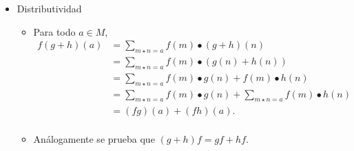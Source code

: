 \begin{itemize}
\begin{itemize}
	
		
		\item Asociatividad: para todo \( a \in M \),
		\begin{align*}
			((fg)h)(a) 
			&= \sum_{x \star y = a} (fg)(x) \bullet h(y) \\[5pt]
			&= \sum_{x \star y = a} \left( \sum_{m \star n = x} f(m) \bullet g(n) \right) \bullet h(y) \\[5pt]
			&= \sum_{\substack{m, n, y \in M \\ (m \star n) \star y = a}} \left(f(m) \bullet g(n)\right) \bullet h(y) \\[5pt]
			&= \sum_{\substack{m, n, y \in M \\ m \star (n \star y) = a}} f(m) \bullet\left( g(n) \bullet h(y)\right) \\[5pt]
			&= \sum_{m \star p = a} f(m) \bullet \left( \sum_{n \star y = p} g(n) \bullet h(y) \right) \\[5pt]
			&= \sum_{m \star p = a} f(m) \bullet (gh)(p) \\[5pt]
			&= (f(gh))(a). \\[5pt]
		\end{align*}
	\end{itemize}
	
	\item Distributividad
	\begin{itemize}
		\item Para todo \( a \in M \),
		\begin{align*}
			f(g + h)(a) 
			&= \sum_{m \star n = a} f(m) \bullet (g + h)(n) \\[5pt]
			&= \sum_{m \star n = a} f(m) \bullet (g(n) + h(n)) \\[5pt]
			&= \sum_{m \star n = a} f(m) \bullet g(n) + f(m) \bullet h(n) \\[5pt]
			&= \sum_{m \star n = a} f(m) \bullet g(n) + \sum_{m \star n = a} f(m) \bullet h(n) \\[5pt]
			&= (fg)(a) + (fh)(a). \\[5pt]
		\end{align*}
		\item Análogamente se prueba que \( (g + h)f = gf + hf \).
	\end{itemize}
	
\end{itemize}

\begin{proposicion}
\end{proposicion}


